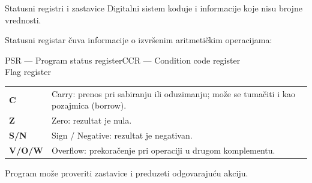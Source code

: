 \begin{frame}[label=06-s002]{Statusni registri i zastavice}
Digitalni sistem koduje i informacije koje nisu brojne vrednosti.
\medskip

Statusni registar čuva informacije o izvršenim aritmetičkim operacijama:
\begin{center}\small PSR — Program status register\quad CCR — Condition code register\\Flag register\end{center}
{\fontsize{10}{12}\selectfont
\begin{tabular}{@{}p{}p{}@{}}
\textbf{C} & Carry: prenos pri sabiranju ili oduzimanju; može se tumačiti i kao pozajmica (borrow).\\[2mm]
\textbf{Z} & Zero: rezultat je nula.\\[2mm]
\textbf{S/N} & Sign / Negative: rezultat je negativan.\\[2mm]
\textbf{V/O/W} & Overflow: prekoračenje pri operaciji u drugom komplementu.\\
\end{tabular}}\par\vspace{2mm}
Program može proveriti zastavice i preduzeti odgovarajuću akciju.
\end{frame}
